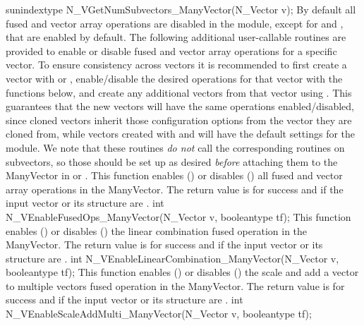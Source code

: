 {
  sunindextype N\_VGetNumSubvectors\_ManyVector(N\_Vector v);
}
By default all fused and vector array operations are disabled in the {\nvecmanyvector}
module, except for  and
, that are enabled by default. The
following additional user-callable routines are provided to enable or
disable fused and vector array operations for a specific vector. To
ensure consistency across vectors it is recommended to first create a
vector with  or ,
enable/disable the desired operations for that vector with the
functions below, and create any additional vectors from that vector
using . This guarantees that the new vectors will have
the same operations enabled/disabled, since cloned vectors inherit
those configuration options from the vector they are cloned from, while
vectors created with  and
 will have the default settings for the
{\nvecmanyvector} module.  We note that these routines \emph{do not} 
call the corresponding routines on subvectors, so those should be set up
as desired \emph{before} attaching them to the ManyVector in
 or .
{
  This function enables () or disables () all fused and
  vector array operations in the ManyVector. The return value is  for
  success and  if the input vector or its  structure are .
}
{
  int N\_VEnableFusedOps\_ManyVector(N\_Vector v, booleantype tf);
}
{
  This function enables () or disables () the linear
  combination fused operation in the ManyVector. The return value is  for
  success and  if the input vector or its  structure are .
}
{
  int N\_VEnableLinearCombination\_ManyVector(N\_Vector v, booleantype tf);
}
{
  This function enables () or disables () the scale and
  add a vector to multiple vectors fused operation in the ManyVector. The
  return value is  for success and  if the input vector or its
   structure are .
}
{
  int N\_VEnableScaleAddMulti\_ManyVector(N\_Vector v, booleantype tf);
}
